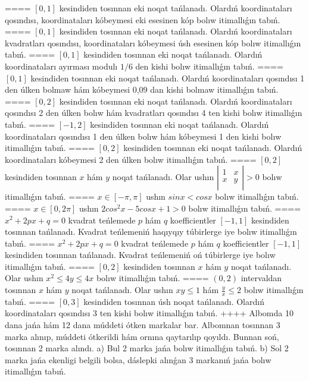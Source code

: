 ====
$\left[ 0,1 \right]$ kesindiden tosınnan eki noqat tańlanadı. Olardıń koordinataları qosındısı, koordinataları kóbeymesi eki esesinen kóp bolıw itimallıǵın tabıń.
====
$\left[ 0,1 \right]$ kesindiden tosınnan eki noqat tańlanadı. Olardıń koordinataları kvadratları qosındısı, koordinataları kóbeymesi úsh esesinen kóp bolıw itimallıǵın tabıń.
====
$\left[ 0,1 \right]$ kesindiden tosınnan eki noqat tańlanadı. Olardıń koordinataları ayırması modulı $1/6$ den kishi bolıw itimallıǵın tabıń.
====
$\left[ 0,1 \right]$ kesindiden tosınnan eki noqat tańlanadı. Olardıń koordinataları qosındısı 1 den úlken bolmaw hám kóbeymesi 0,09 dan kishi bolmaw itimallıǵın tabıń.
====
$\left[ 0,2 \right]$ kesindiden tosınnan eki noqat tańlanadı. Olardıń koordinataları qosındısı 2 den úlken bolıw hám kvadratları qosındısı 4 ten kishi bolıw itimallıǵın tabıń.
====
$\left[ -1,2 \right]$ kesindiden tosınnan eki noqat tańlanadı. Olardıń koordinataları qosındısı 1 den úlken bolıw hám kóbeymesi 1 den kishi bolıw itimallıǵın tabıń.
====
$\left[ 0,2 \right]$ kesindiden tosınnan eki noqat tańlanadı. Olardıń koordinataları kóbeymesi 2 den úlken bolıw itimallıǵın tabıń.
====
$\left[ 0,2 \right]$ kesindiden tosınnan $x$ hám $y$ noqat tańlanadı. Olar ushın $\left| \begin{matrix}
   1 & x  \\
   x & y  \\
\end{matrix} \right|>0$ bolıw itimallıǵın tabıń.
====
$x\in \left[ -\pi ,\pi  \right]$ ushın $sinx<cosx$ bolıw itimallıǵın tabıń.
====
$x\in \left[ 0,2\pi  \right]$ ushın $2co{{s}^{2}}x-5cosx+1>0$ bolıw itimallıǵın tabıń.
====
${{x}^{2}}+2px+q=0$ kvadrat teńlemede $p$ hám $q$ koefficientler $\left[ -1,1 \right]$ kesindiden tosınnan tańlanadı. Kvadrat teńlemeniń haqıyqıy túbirlerge iye bolıw itimallıǵın tabıń.
====
${{x}^{2}}+2px+q=0$ kvadrat teńlemede $p$ hám $q$ koefficientler $\left[ -1,1 \right]$ kesindiden tosınnan tańlanadı. Kvadrat teńlemeniń oń túbirlerge iye bolıw itimallıǵın tabıń.
====
$\left[ 0,2 \right]$ kesindiden tosınnan $x$ hám $y$ noqat tańlanadı. Olar ushın ${{x}^{2}}\le 4y\le 4x$ bolıw itimallıǵın tabıń.
====
$\left( 0,2 \right)$ intervaldan tosınnan $x$ hám $y$ noqat tańlanadı. Olar ushın $xy\le 1$ hám $\frac{y}{x}\le 2$ bolıw itimallıǵın tabıń.
====
$\left[ 0,3 \right]$ kesindiden tosınnan úsh noqat tańlanadı. Olardıń koordinataları qosındısı 3 ten kishi bolıw itimallıǵın tabıń.
++++
Albomda 10 dana jańa hám 12 dana múddeti ótken markalar bar. Albomnan tosınnan 3 marka alınıp, múddeti ótkerildi hám ornına qaytarılıp qoyıldı. Bunnan soń, tosınnan 2 marka alındı. a) Bul 2 marka jańa bolıw itimallıǵın tabıń. b) Sol 2 marka jańa ekenligi belgili bolsa, dáslepki alınǵan 3 markanıń jańa bolıw itimallıǵın tabıń.
